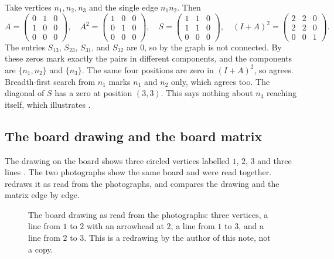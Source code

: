 Take vertices $n_1,n_2,n_3$ and the single edge $n_1n_2$. Then
\[
A=\begin{pmatrix}0&1&0\\1&0&0\\0&0&0\end{pmatrix},\quad
A^2=\begin{pmatrix}1&0&0\\0&1&0\\0&0&0\end{pmatrix},\quad
S=\begin{pmatrix}1&1&0\\1&1&0\\0&0&0\end{pmatrix},\quad
(I+A)^2=\begin{pmatrix}2&2&0\\2&2&0\\0&0&1\end{pmatrix}.
\]
The entries $S_{13}$, $S_{23}$, $S_{31}$, and $S_{32}$ are $0$, so by  the graph is not connected. By  these zeros mark exactly the pairs in different components, and the components are $\{n_1,n_2\}$ and $\{n_3\}$. The same four positions are zero in $(I+A)^2$, so  agrees. Breadth-first search from $n_1$ marks $n_1$ and $n_2$ only, which agrees too. The diagonal of $S$ has a zero at position $(3,3)$. This says nothing about $n_3$ reaching itself, which illustrates .

\subsection{The board drawing and the board matrix}


The drawing on the board shows three circled vertices labelled $1$, $2$, $3$ and three lines \cite{whiteboard1,whiteboard2}. The two photographs show the same board and were read together.  redraws it as read from the photographs, and  compares the drawing and the matrix edge by edge.

\begin{figure}[ht]
\centering
{}
\caption{The board drawing as read from the photographs: three vertices, a line from $1$ to $2$ with an arrowhead at $2$, a line from $1$ to $3$, and a line from $2$ to $3$. This is a redrawing by the author of this note, not a copy.}\label{fig:boarddrawing}
\end{figure}

